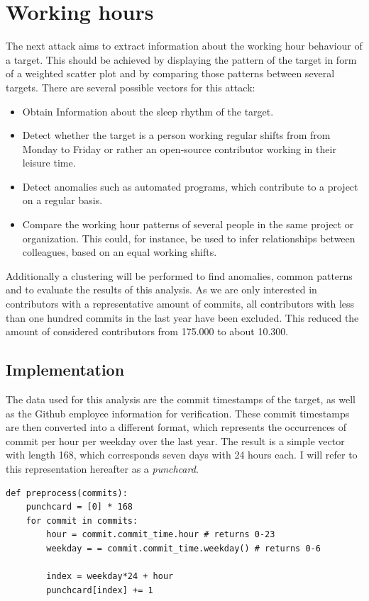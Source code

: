 \section{Working hours}

The next attack aims to extract information about the working hour behaviour of a target.
This should be achieved by displaying the pattern of the target in form of a weighted scatter plot and by comparing those patterns between several targets.
There are several possible vectors for this attack:

\begin{itemize}
    \item Obtain Information about the sleep rhythm of the target.
    \item Detect whether the target is a person working regular shifts from from Monday to Friday or rather an open-source contributor working in their leisure time.
    \item Detect anomalies such as automated programs, which contribute to a project on a regular basis.
    \item Compare the working hour patterns of several people in the same project or organization. This could, for instance, be used to infer relationships between colleagues, based on an equal working shifts.
\end{itemize}

Additionally a clustering will be performed to find anomalies, common patterns and to evaluate the results of this analysis.
As we are only interested in contributors with a representative amount of commits, all contributors with less than one hundred commits in the last year have been excluded.
This reduced the amount of considered contributors from 175.000 to about 10.300.


\subsection{Implementation}\label{punchcard-implementation}

The data used for this analysis are the commit timestamps of the target, as well as the Github employee information for verification.
These commit timestamps are then converted into a different format, which represents the occurrences of commit per hour per weekday over the last year.
The result is a simple vector with length 168, which corresponds seven days with 24 hours each.
I will refer to this representation hereafter as a \emph{punchcard}.

\begin{verbatim}
def preprocess(commits):
    punchcard = [0] * 168
    for commit in commits:
        hour = commit.commit_time.hour # returns 0-23
        weekday = = commit.commit_time.weekday() # returns 0-6

        index = weekday*24 + hour
        punchcard[index] += 1

\end{verbatim}
\begingroup
{}\label{lst:puchcard-preprocessing}
\endgroup

